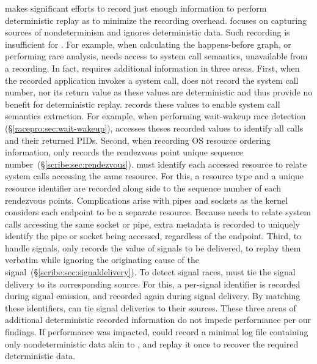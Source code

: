 \scribe makes significant efforts to record just enough information
to perform deterministic replay as to minimize the recording overhead.
\scribe focuses on capturing sources of nondeterminism and
ignores deterministic data.
Such recording is insufficient for \racepro.
For example, when calculating the happens-before graph, or performing race
analysis, \racepro needs access to system call semantics, unavailable from
a \scribe recording. In fact, \racepro requires additional information in
three areas. First, when the recorded application invokes a system call, \scribe
does not record the system call number, nor its return value as these values are
deterministic and thus provide no benefit for deterministic replay.
\racepro records these values to enable system call semantics extraction.
For example, when performing wait-wakeup race detection
(\S\ref{racepro:sec:wait-wakeup}), \racepro accesses theses recorded values to
identify all  calls and their returned PIDs.
Second, when recording OS resource ordering information, \scribe only records
the rendezvous point unique sequence number~(\S\ref{scribe:sec:rendezvous}).
\racepro must identify each accessed resource to relate
system calls accessing the same resource. For this, a resource type and a unique resource
identifier are recorded along side to the sequence number of each rendezvous
points. Complications arise with pipes and sockets as the kernel considers each
endpoint to be a separate resource. Because \racepro needs to
relate system calls accessing the same socket or pipe, extra metadata is recorded to
uniquely identify the pipe or socket being accessed, regardless of the endpoint.
Third, to handle signals, \scribe only records the value of signals to be delivered,
to replay them verbatim while ignoring the originating cause of the
signal~(\S\ref{scribe:sec:signaldelivery}).
To detect signal races, \racepro must tie the signal delivery to its
corresponding source. For this, a per-signal identifier is recorded during
signal emission, and recorded again during signal delivery.
By matching these identifiers, \racepro can tie signal deliveries to their sources.
These three areas of additional deterministic recorded information do not impede
performance per our findings. If performance was impacted, \racepro could
record a minimal log file containing only nondeterministic data akin to \scribe,
and replay it once to recover the required deterministic data.

